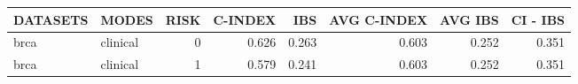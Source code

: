 \begin{tabular}{llrrrrrr}
\hline
 DATASETS   & MODES    &   RISK &   C-INDEX &   IBS &   AVG C-INDEX &   AVG IBS &   CI - IBS \\
\hline
 brca       & clinical &      0 &     0.626 & 0.263 &         0.603 &     0.252 &      0.351 \\
 brca       & clinical &      1 &     0.579 & 0.241 &         0.603 &     0.252 &      0.351 \\
\hline
\end{tabular}